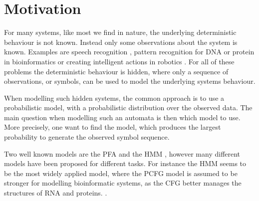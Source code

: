 \section{Motivation}
For many systems, like most we find in nature, the underlying deterministic behaviour is not known. Instead only some observations about the system is known. Examples are speech recognition \cite{Rabiner89hmm}, pattern recognition for DNA or protein in bioinformatics \cite{Sakakibara2005} or creating intelligent actions in robotics \cite{Rivest1993}. For all of these problems the deterministic behaviour is hidden, where only a sequence of observations, or symbols, can be used to model the underlying systems behaviour.

When modelling such hidden systems, the common approach is to use a probabilistic model, with a probabilistic distribution over the observed data. The main question when modelling such an automata is then which model to use. More precisely, one want to find the model, which produces the largest probability to generate the observed symbol sequence.

Two well known models are the PFA \cite{pazintroduction} and the HMM \cite{Rabiner89hmm}, however many different models have been proposed for different tasks. For instance the HMM seems to be the most widely applied model, where the PCFG model is assumed to be stronger for modelling bioinformatic systems, as the CFG better manages the structures of RNA and proteins. \cite{Sakakibara2005}.
